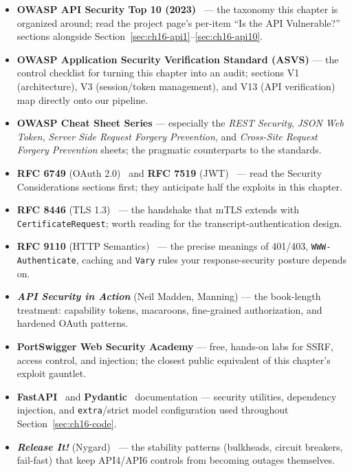 \begin{itemize}[itemsep=0.3em]
  \item \textbf{OWASP API Security Top 10 (2023)}~\cite{owaspapisecurity}
        --- the taxonomy this chapter is organized around; read the
        project page's per-item ``Is the API Vulnerable?'' sections
        alongside Section~\ref{sec:ch16-api1}--\ref{sec:ch16-api10}.
  \item \textbf{OWASP Application Security Verification Standard (ASVS)}
        --- the control checklist for turning this chapter into an audit;
        sections V1 (architecture), V3 (session/token management), and
        V13 (API verification) map directly onto our pipeline.
  \item \textbf{OWASP Cheat Sheet Series} --- especially the \emph{REST
        Security}, \emph{JSON Web Token}, \emph{Server Side Request
        Forgery Prevention}, and \emph{Cross-Site Request Forgery
        Prevention} sheets; the pragmatic counterparts to the standards.
  \item \textbf{RFC 6749} (OAuth 2.0)~\cite{rfc6749} and \textbf{RFC 7519}
        (JWT)~\cite{rfc7519} --- read the Security Considerations sections
        first; they anticipate half the exploits in this chapter.
  \item \textbf{RFC 8446} (TLS 1.3)~\cite{rfc8446} --- the handshake that
        mTLS extends with \texttt{CertificateRequest}; worth reading for
        the transcript-authentication design.
  \item \textbf{RFC 9110} (HTTP Semantics)~\cite{rfc9110} --- the precise
        meanings of 401/403, \texttt{WWW-Authenticate}, caching and
        \texttt{Vary} rules your response-security posture depends on.
  \item \textbf{\emph{API Security in Action}} (Neil Madden, Manning) ---
        the book-length treatment: capability tokens, macaroons,
        fine-grained authorization, and hardened OAuth patterns.
  \item \textbf{PortSwigger Web Security Academy} --- free, hands-on labs
        for SSRF, access control, and injection; the closest public
        equivalent of this chapter's exploit gauntlet.
  \item \textbf{FastAPI}~\cite{fastapidocs} and
        \textbf{Pydantic}~\cite{pydanticdocs} documentation --- security
        utilities, dependency injection, and \texttt{extra}/strict model
        configuration used throughout Section~\ref{sec:ch16-code}.
  \item \textbf{\emph{Release It!}} (Nygard)~\cite{nygard2018releaseit} ---
        the stability patterns (bulkheads, circuit breakers, fail-fast)
        that keep API4/API6 controls from becoming outages themselves.
\end{itemize}

